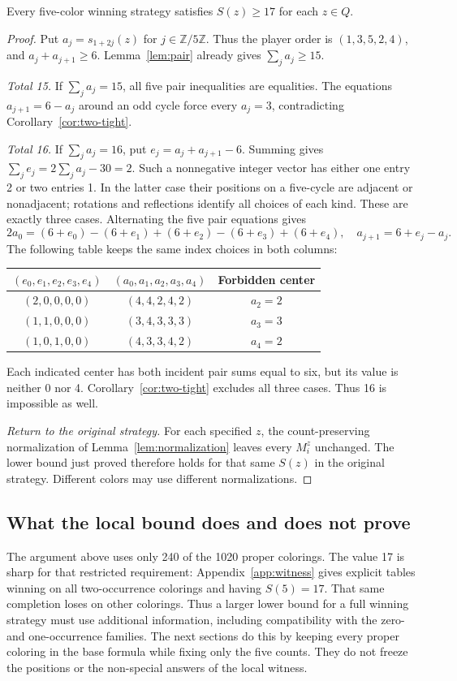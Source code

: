 \begin{proposition}\label{prop:seventeen}
Every five-color winning strategy satisfies $S(z)\geq17$ for each $z\in Q$.
\end{proposition}
\begin{proof}
Put $a_j=s_{1+2j}(z)$ for $j\in\mathbb Z/5\mathbb Z$. Thus the player
order is $(1,3,5,2,4)$, and $a_j+a_{j+1}\geq6$. Lemma~\ref{lem:pair}
already gives $\sum_j a_j\geq15$.

\emph{Total 15.}
If $\sum_j a_j=15$, all five pair inequalities are equalities. The equations
$a_{j+1}=6-a_j$ around an odd cycle force every $a_j=3$, contradicting
Corollary~\ref{cor:two-tight}.

\emph{Total 16.}
If $\sum_j a_j=16$, put $e_j=a_j+a_{j+1}-6$. Summing gives
$\sum_j e_j=2\sum_j a_j-30=2$. Such a nonnegative integer vector has
either one entry 2 or two entries 1. In the latter case their positions
on a five-cycle are adjacent or nonadjacent; rotations and reflections
identify all choices of each kind. These are exactly three cases.
Alternating the five pair equations gives
\[
2a_0=(6+e_0)-(6+e_1)+(6+e_2)-(6+e_3)+(6+e_4),
\quad a_{j+1}=6+e_j-a_j.
\]
The following table keeps the same index choices in both columns:
\begin{center}\small
\begin{tabular}{@{}ccc@{}}
\toprule
$(e_0,e_1,e_2,e_3,e_4)$&$(a_0,a_1,a_2,a_3,a_4)$&Forbidden center\\
\midrule
$(2,0,0,0,0)$&$(4,4,2,4,2)$&$a_2=2$\\
$(1,1,0,0,0)$&$(3,4,3,3,3)$&$a_3=3$\\
$(1,0,1,0,0)$&$(4,3,3,4,2)$&$a_4=2$\\
\bottomrule
\end{tabular}
\end{center}
Each indicated center has both incident pair sums equal to six, but its
value is neither 0 nor 4. Corollary~\ref{cor:two-tight} excludes all
three cases. Thus 16 is impossible as well.

\emph{Return to the original strategy.}
For each specified $z$, the count-preserving normalization of
Lemma~\ref{lem:normalization} leaves every $M_i^z$ unchanged. The lower
bound just proved therefore holds for that same $S(z)$ in the original
strategy. Different colors may use different normalizations.
\end{proof}

\subsection{What the local bound does and does not prove}
The argument above uses only 240 of the 1020 proper colorings. The value
17 is sharp for that restricted requirement: Appendix~\ref{app:witness}
gives explicit tables winning on all two-occurrence colorings and having
$S(5)=17$. That same completion loses on other colorings. Thus a larger
lower bound for a full winning strategy must use additional information,
including compatibility with the zero- and one-occurrence families.
The next sections do this by keeping every proper coloring in the base
formula while fixing only the five counts. They do not freeze the
positions or the non-special answers of the local witness.

